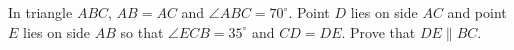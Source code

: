 In triangle $ABC$, $AB=AC$ and $\angle ABC=70^\circ$. Point $D$ lies on side $AC$ and point $E$ lies on side $AB$ so that $\angle ECB=35^\circ$ and $CD=DE$. Prove that $DE\parallel BC$.
